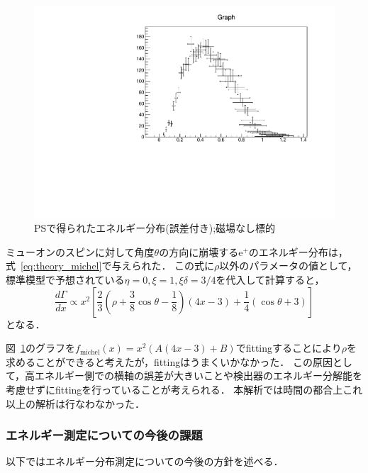   \begin{figure}[H]
   \centering
   \includegraphics[height = 0.7\columnwidth , angle = -90]{figure/ikemitsu/michel_PS_gosa.pdf}
   \caption{PSで得られたエネルギー分布(誤差付き);磁場なし標的}
   \label{michel_PS_gosa}
  \end{figure}
  
  ミューオンのスピンに対して角度$\theta$の方向に崩壊する$\mathrm{e}^{+}$のエネルギー分布は，式~\ref{eq:theory_michel}で与えられた．
  この式に$\rho$以外のパラメータの値として，標準模型で予想されている$\eta = 0 , \xi = 1 , \xi \delta = 3/4$を代入して計算すると，
  \begin{equation*}
   \frac{d\Gamma}{dx} \propto x^{2} [\frac{2}{3}(\rho + \frac{3}{8}\cos \theta - \frac{1}{8})(4x-3) + \frac{1}{4}(\cos \theta + 3)]
  \end{equation*}
  となる．

  図~\ref{michel_PS_gosa}のグラフを$f_{\mathrm{michel}}(x) = x^{2} (A(4x -3) + B)$でfittingすることにより$\rho$を求めることができると考えたが，fittingはうまくいかなかった．
  この原因として，高エネルギー側での横軸の誤差が大きいことや検出器のエネルギー分解能を考慮せずにfittingを行っていることが考えられる．
  本解析では時間の都合上これ以上の解析は行なわなかった．

  \subsubsection{エネルギー測定についての今後の課題}
  以下ではエネルギー分布測定についての今後の方針を述べる．

